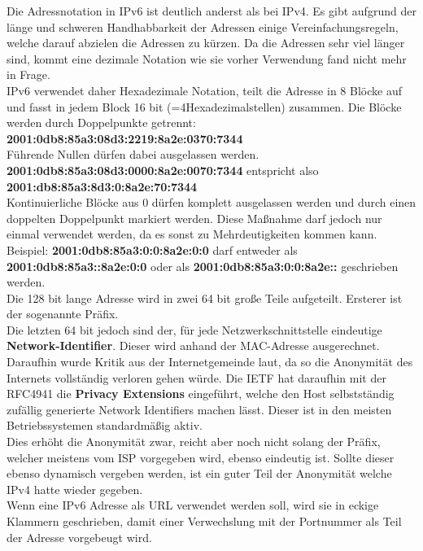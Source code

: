 \documentclass[11pt,a4paper]{report}
\begin{document}
Die Adressnotation in IPv6 ist deutlich anderst als bei IPv4. Es gibt aufgrund der länge und schweren Handhabbarkeit der Adressen einige Vereinfachungsregeln, welche darauf abzielen die Adressen zu kürzen. Da die Adressen sehr viel länger sind, kommt eine dezimale Notation wie sie vorher Verwendung fand nicht mehr in Frage.\\
IPv6 verwendet daher Hexadezimale Notation, teilt die Adresse in 8 Blöcke auf und fasst in jedem Block 16 bit (=4Hexadezimalstellen) zusammen. Die Blöcke werden durch Doppelpunkte getrennt: \textbf{2001:0db8:85a3:08d3:2219:8a2e:0370:7344}\\
Führende Nullen dürfen dabei ausgelassen werden. \textbf{2001:0db8:85a3:08d3:0000:8a2e:0070:7344} entspricht also \textbf{2001:db8:85a3:8d3:0:8a2e:70:7344}\\
Kontinuierliche Blöcke aus 0 dürfen komplett ausgelassen werden und durch einen doppelten Doppelpunkt markiert werden. Diese Maßnahme darf jedoch nur einmal verwendet werden, da es sonst zu Mehrdeutigkeiten kommen kann. Beispiel: \textbf{2001:0db8:85a3:0:0:8a2e:0:0} darf entweder als \textbf{2001:0db8:85a3::8a2e:0:0} oder als \textbf{2001:0db8:85a3:0:0:8a2e::} geschrieben werden.\\

Die 128 bit lange Adresse wird in zwei 64 bit große Teile aufgeteilt. Ersterer ist der sogenannte Präfix.\\
Die letzten 64 bit jedoch sind der, für jede Netzwerkschnittstelle eindeutige \textbf{Network-Identifier}. Dieser wird anhand der MAC-Adresse ausgerechnet.\\
Daraufhin wurde Kritik aus der Internetgemeinde laut, da so die Anonymität des Internets vollständig verloren gehen würde. Die IETF hat daraufhin mit der RFC4941 die \textbf{Privacy Extensions} eingeführt, welche den Host selbstständig zufällig generierte Network Identifiers machen lässt. Dieser ist in den meisten Betriebssystemen standardmäßig aktiv.\\
Dies erhöht die Anonymität zwar, reicht aber noch nicht solang der Präfix, welcher meistens vom ISP vorgegeben wird, ebenso eindeutig ist. Sollte dieser ebenso dynamisch vergeben werden, ist ein guter Teil der Anonymität welche IPv4 hatte wieder gegeben.\\

Wenn eine IPv6 Adresse als URL verwendet werden soll, wird sie in eckige Klammern geschrieben, damit einer Verwechslung mit der Portnummer als Teil der Adresse vorgebeugt wird.\\
\end{document}
